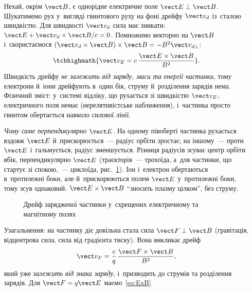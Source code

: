 Нехай, окрім $\vect B$, є однорідне електричне поле $\vect E\perp\vect B$. Шукатимемо рух
у~вигляді гвинтового руху на фоні дрейфу $\vect v_d$ із~сталою швидкістю. Для швидкості
$\vect v_d$ сила має зникати: $\vect E+\vect v_d\times\vect B/c=0$. Помножимо векторно на
$\vect B$ і~скористаємося $(\vect v_d\times\vect B)\times\vect B=-B^2\vect v_{d\perp}$:
\begin{equation}\label{eq:ExB}
	\tcbhighmath{\vect v_E=c\,\frac{\vect E\times\vect B}{B^2}}.
\end{equation}
Швидкість дрейфу \emph{не залежить від заряду, маси та енергії частинки}, тому електрони
й~іони дрейфують в~один бік, струму й~розділення зарядів нема. Фізичний зміст: у~системі
відліку, що рухається зі швидкістю $\vect v_E$, електричного поля немає (нерелятивістське
наближення), і~частинка просто гвинтом обертається навколо силової лінії.

\emph{Чому саме перпендикулярно $\vect E$.} На одному півоберті частинка рухається вздовж $\vect E$ й~прискорюється~--- радіус орбіти зростає;
на іншому~--- проти $\vect E$ і~гальмується, радіус зменшується. Різниця радіусів зсуває центр орбіти вбік, перпендикулярно $\vect E$
(траєкторія~--- трохоїда, а~для частинки, що стартує зі спокою,~--- циклоїда, рис.~\ref{pic:ExB-drift}). Іон і~електрон обертаються в~протилежні боки, але й~прискорюються полем $\vect E$ у~протилежні боки, тому зсув однаковий: $\vect E\times\vect B$ \enquote{зносить плазму цілком}, без струму.

\begin{figure}[h!]\centering
	\caption{Дрейф зарядженої частинки у~схрещених електричному та магнітному полях}
	\label{pic:ExB-drift}
\end{figure}

Узагальнення: на частинку діє довільна стала сила $\vect F\perp\vect B$ (гравітація,
відцентрова сила, сила від градієнта тиску). Вона викликає дрейф
\begin{equation}\label{eq:drift-force}
	\vect v_F=\frac{c}{q}\,\frac{\vect F\times\vect B}{B^2},
\end{equation}
який уже \emph{залежить від знака заряду}, і~призводить до струмів та розділення зарядів.
Для $\vect F=q\vect E$ маємо~\eqref{eq:ExB}.


